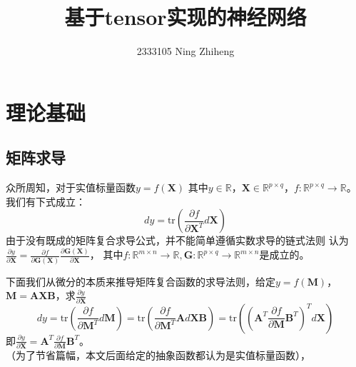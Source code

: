 \documentclass[12pt,a4paper]{ctexart}
\title{\heiti 基于tensor实现的神经网络}
\author{2333105 Ning Zhiheng}
\date{}
\numberwithin{equation}{section}%
\numberwithin{figure}{section}%
\begin{document}
\maketitle

\section{理论基础}
\subsection{矩阵求导}
\label{section:juzhenqiudao}
众所周知，对于实值标量函数$y=f(\boldsymbol{X})$
其中$y \in \mathbb{R}$，$\boldsymbol{X} \in \mathbb{R}^{p \times q}$，$ f: \mathbb{R}^{p \times q} \rightarrow \mathbb{R}$。
我们有下式成立：
\begin{equation}
    d y=\mathrm{tr}(\frac{\partial{f}}{\partial{\boldsymbol{X}}^T} d \boldsymbol{X}) \label {daoshu}
\end{equation}
由于没有既成的矩阵复合求导公式，并不能简单遵循实数求导的链式法则
认为$\frac{\partial{y}}{\partial{\boldsymbol{X}}}=\frac{\partial{f}}{\partial{\boldsymbol{G(X)}}} \frac{\partial{\boldsymbol{G(X)}}}{\partial{\boldsymbol{X}}}$，
其中$f: \mathbb{R}^{m \times n} \rightarrow \mathbb{R},\boldsymbol{G}:\mathbb{R}^{p \times q} \rightarrow \mathbb{R}^{m \times n}$是成立的。

下面我们从微分的本质来推导矩阵复合函数的求导法则，给定$y=f(\boldsymbol{M})$，
$\boldsymbol{M}=\boldsymbol{AXB}$，求$\frac{\partial{y}}{\partial{\boldsymbol{X}}}$
\begin{equation}
d y=\mathrm{tr}(\frac{\partial{f}}{\partial{\boldsymbol{M}}^T} d \boldsymbol{M})
                =\mathrm{tr}(\frac{\partial{f}}{\partial{\boldsymbol{M}}^T} \boldsymbol{A} d \boldsymbol{X} \boldsymbol{B} )
                =\mathrm{tr}( ( \boldsymbol{A}^T \frac{\partial{f}}{\partial{\boldsymbol{M}}} \boldsymbol{B}^T )^T d \boldsymbol{X})
\end{equation}
即$\frac{\partial{y}}{\partial{\boldsymbol{X}}}=  \boldsymbol{A}^T \frac{\partial{f}}{\partial{\boldsymbol{M}}} \boldsymbol{B}^T $。\\
（为了节省篇幅，本文后面给定的抽象函数都认为是实值标量函数），
\end{document}
